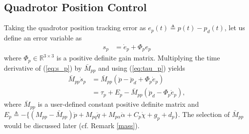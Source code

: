 \documentclass[letterpaper, 10 pt, conference]{ieeeconf}  %
\begin{document}
\subsection{Quadrotor Position Control}

Taking the quadrotor position tracking error as $e_p(t) \triangleq p(t) - p_d(t)$, let us define an error variable as
\begin{align}
     s_p &= \dot{e}_p + \Phi_p e_p \label{eq:s_p}
 \end{align}
where $\Phi_{p} \in \mathbb{R}^{3 \times 3}$ is a positive definite gain matrix. Multiplying the time derivative of (\ref{eq:s_p}) by $\bar{M}_{pp}$ and  using (\ref{eq:tau_p}) yields
\begin{align}
\bar{M}_{pp} \dot{s}_p &= \bar{M}_{pp}(\ddot{p}- \ddot{p}_d+ \Phi_{p} {\dot{e}_p}) \nonumber \\ 
&= {\tau_{p}} + {E}_{p} - \bar{M}_{pp}(\ddot{p}_d- \Phi_{p} {\dot{e}_p}), \label{eq:sp_dot}
\end{align}
where $\bar{M}_{pp}$ is a user-defined constant positive definite matrix and $E_{p} \triangleq -\{(M_{pp} - \bar{M}_{pp})\ddot{p} + M_{pq}\ddot{q} + M_{p\alpha}\ddot{\alpha} + C_{p}\dot{\chi} + g_{p} + d_{p} \}$. The selection of $\bar{M}_{pp}$ would be discussed later (cf. Remark \ref{mass}).




\end{document}
